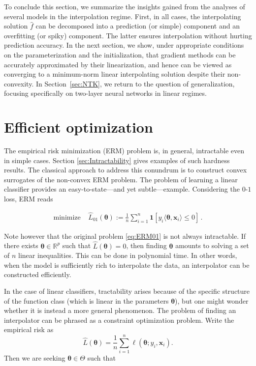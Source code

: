 To conclude this section, we summarize the insights gained from the analyses of several models in the interpolation regime. First, in all cases, the interpolating solution $\widehat{f}$ can be decomposed into a prediction (or simple) component and an overfitting (or spiky) component. The latter ensures interpolation without hurting prediction accuracy.  In the next section, we show, under appropriate conditions on the parameterization and the initialization, that gradient methods can be accurately approximated by their linearization, and hence can be viewed as converging to a minimum-norm linear interpolating solution despite their non-convexity. In Section~\ref{sec:NTK}, we return to the question of generalization, focusing specifically on two-layer neural networks in linear regimes.

\section{Efficient optimization}
\label{sec:efficient}

The empirical risk minimization (ERM) problem is, in general, intractable even in simple cases. Section \ref{sec:Intractability} gives examples of such hardness results. The classical approach to address this conundrum is to construct convex surrogates of the non-convex ERM problem. The problem of learning a linear classifier provides an easy-to-state---and yet subtle---example. Considering the $0$-$1$ loss, ERM reads

\begin{align}
  \mbox{minimize}\;\;\;\; \widehat{L}_{01}({\boldsymbol \theta}) :=\frac{1}{n}\sum_{i=1}^n\ensuremath{\boldsymbol{1}\left[y_i\langle{\boldsymbol \theta},{\boldsymbol x}_i\rangle \le 0\right]}\, .\label{eq:ERM01}
\end{align}

Note however that the original problem \eqref{eq:ERM01} is not always intractable. If there exists ${\boldsymbol \theta}\in{\mathbb R}^p$ such that $\widehat{L}({\boldsymbol \theta})=0$, then finding ${\boldsymbol \theta}$  amounts to solving a set of $n$ linear inequalities. This  can be done in polynomial time.  In other words, when the model is sufficiently rich to interpolate the data, an interpolator can be constructed efficiently.

In the case of linear classifiers, tractability arises because of the specific structure of the function class (which is linear in the parameters ${\boldsymbol \theta}$), but one might wonder whether it is instead a more general phenomenon. The problem of finding an interpolator can be phrased as a constraint optimization problem. Write the empirical risk as 
$$\widehat{L}({\boldsymbol \theta}) = \frac{1}{n}\sum_{i=1}^n\ell({\boldsymbol \theta};y_i,{\boldsymbol x}_i).$$  Then we are seeking ${\boldsymbol \theta}\in \Theta$ such that

